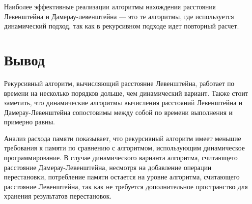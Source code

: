 Наиболее эффективные реализации алгоритмы нахождения расстояния Левенштейна и
Дамерау-левенштейна  --- это те алгоритмы, где используется динамический подход, так
как в рекурсивном подходе идет повторный расчет. 

\section{Вывод}
Рекурсивный алгоритм, вычисляющий расстояние Левенштейна, работает по времени на
несколько порядков дольше, чем динамический вариант. Также стоит заметить, что
динамические алгоритмы вычисления расстояний Левенштейна и Дамерау-Левенштейна
сопостовимы между собой по времени выполнения и примерно равны.

Анализ расхода памяти показывает, что рекурсивный алгоритм имеет меньшие
требования к памяти по сравнению с алгоритмом, использующим динамическое
программирование. В случае динамического варианта алгоритма, считающего расстояние
Дамерау-Левенштейна, несмотря на добавление операции перестановки, потребление
памяти остается на уровне алгоритма, считающего расстояние Левенштейна, так
как не требуется дополнительное пространство для хранения результатов перестановок.



